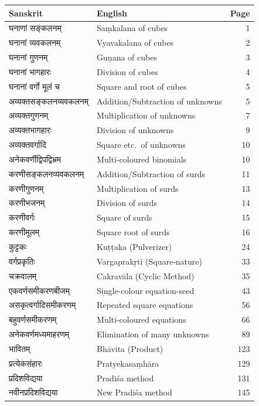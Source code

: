 \documentclass[11pt,a4paper]{article}
\newcommand{\dev}[1]{{\devanagarifont #1}}
\begin{document}
\begin{center}
\renewcommand{\arraystretch}{1.4}
\begin{longtable}{p{5.5cm}p{5.5cm}r}
\toprule
\textbf{Sanskrit} & \textbf{English} & \textbf{Page} \\
\midrule
\endhead
\dev{घनाणां सङ्कलनम्} & Sa\d{m}kalana of cubes & 1 \\
\dev{घनानां व्यवकलनम्} & Vyavakalana of cubes & 2 \\
\dev{घनानां गुणनम्} & Gu\d{n}ana of cubes & 3 \\
\dev{घनानां भागहारः} & Division of cubes & 4 \\
\dev{घनानां वर्गो मूलं च} & Square and root of cubes & 5 \\
\dev{अव्यक्तसङ्कलनव्यवकलनम्} & Addition/Subtraction of unknowns & 5 \\
\dev{अव्यक्तगुणनम्} & Multiplication of unknowns & 7 \\
\dev{अव्यक्तभागहारः} & Division of unknowns & 9 \\
\dev{अव्यक्तवर्गादि} & Square etc.~of unknowns & 10 \\
\dev{अनेकवर्णीद्विपद्विभ्रम} & Multi-coloured binomials & 10 \\
\dev{करणीसङ्कलनव्यवकलनम्} & Addition/Subtraction of surds & 11 \\
\dev{करणीगुणनम्} & Multiplication of surds & 13 \\
\dev{करणीभजनम्} & Division of surds & 14 \\
\dev{करणीवर्गः} & Square of surds & 15 \\
\dev{करणीमूलम्} & Square root of surds & 16 \\
\dev{कुट्टकः} & Ku\d{t}\d{t}aka (Pulverizer) & 24 \\
\dev{वर्गप्रकृतिः} & Vargaprak\d{r}ti (Square-nature) & 33 \\
\dev{चक्रवालम्} & Cakrav\={a}la (Cyclic Method) & 35 \\
\dev{एकवर्णसमीकरणबीजम्} & Single-colour equation-seed & 43 \\
\dev{असकृत्वर्गादिसमीकरणम्} & Repeated square equations & 56 \\
\dev{बहुवर्णसमीकरणम्} & Multi-coloured equations & 66 \\
\dev{अनेकवर्णमध्यमाहरणम्} & Elimination of many unknowns & 89 \\
\dev{भावितम्} & Bh\={a}vita (Product) & 123 \\
\dev{प्रत्येकसंहारः} & Pratyekasa\d{m}h\={a}ra & 129 \\
\dev{प्रदिशविद्यया} & Pradi\'{s}a method & 131 \\
\dev{नवीनप्रदिशविद्यया} & New Pradi\'{s}a method & 145 \\
\bottomrule
\end{longtable}
\end{center}
\clearpage
\end{document}
